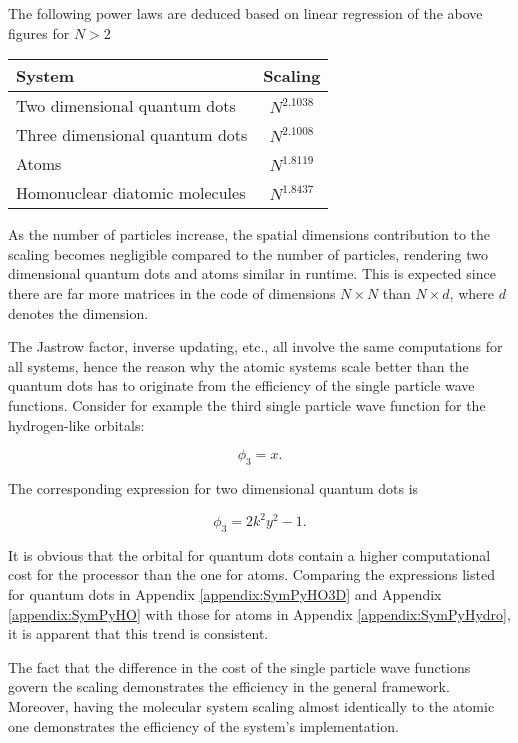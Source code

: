 The following power laws are deduced based on linear regression of the above figures for $N > 2$

\begin{tabular}{l|c}
System & Scaling \\
\hline
Two dimensional quantum dots & $N^{2.1038}$ \\
Three dimensional quantum dots & $N^{2.1008}$ \\
Atoms & $N^{1.8119}$ \\
Homonuclear diatomic molecules & $N^{1.8437}$ \\ 
\end{tabular}


As the number of particles increase, the spatial dimensions contribution to the scaling becomes negligible compared to the number of particles, rendering two dimensional quantum dots and atoms similar in runtime. This is expected since there are far more matrices in the code of dimensions $N\times N$ than $N \times d$, where $d$ denotes the dimension. 

The Jastrow factor, inverse updating, etc., all involve the same computations for all systems, hence the reason why the atomic systems scale better than the quantum dots has to originate from the efficiency of the single particle wave functions. Consider for example the third single particle wave function for the hydrogen-like orbitals:

\begin{equation}
 \phi_3 = x.
\end{equation}

The corresponding expression for two dimensional quantum dots is

\begin{equation}
  \phi_3 = 2k^2y^2 - 1.
\end{equation}

It is obvious that the orbital for quantum dots contain a higher computational cost for the processor than the one for atoms. Comparing the expressions listed for quantum dots in Appendix \ref{appendix:SymPyHO3D} and Appendix \ref{appendix:SymPyHO} with those for atoms in Appendix \ref{appendix:SymPyHydro}, it is apparent that this trend is consistent.

The fact that the difference in the cost of the single particle wave functions govern the scaling demonstrates the efficiency in the general framework. Moreover, having the molecular system scaling almost identically to the atomic one demonstrates the efficiency of the system's implementation. 





